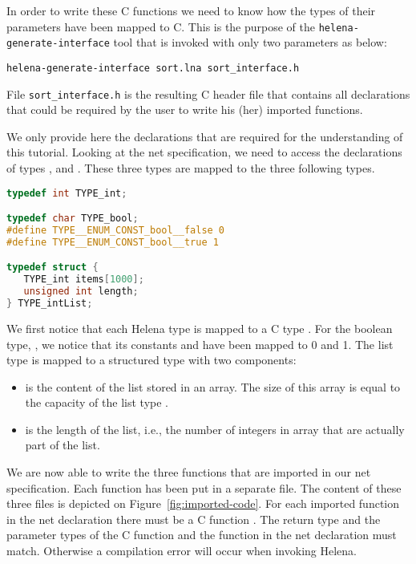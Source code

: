 In order to write these C functions we need to know how the types of
their parameters have been mapped to C.  This is the purpose of the
\verb+helena-generate-interface+ tool that is invoked with only two
parameters as below:
\begin{verbatim}
helena-generate-interface sort.lna sort_interface.h
\end{verbatim}
File \verb+sort_interface.h+ is the resulting C header file that
contains all declarations that could be required by the user to write
his (her) imported functions.

We only provide here the declarations that are required for the
understanding of this tutorial.  Looking at the net specification, we
need to access the declarations of types ,  and
.  These three types are mapped to the three following types.
\begin{lstlisting}[language=C]
typedef int TYPE_int;

typedef char TYPE_bool;
#define TYPE__ENUM_CONST_bool__false 0
#define TYPE__ENUM_CONST_bool__true 1

typedef struct {
   TYPE_int items[1000];
   unsigned int length;
} TYPE_intList;
\end{lstlisting}
We first notice that each Helena type  is mapped to a C
type .  For the boolean type, , we
notice that its constants  and  have been mapped to
0 and 1.  The list type  is mapped to a structured type
 with two components:
\begin{itemize}
\item{} is the content of the list stored in an array.  The
  size of this array is equal to the capacity of the list type
  .
\item{} is the length of the list, i.e., the number of
  integers in array  that are actually part of the list.
\end{itemize}

We are now able to write the three functions that are imported in our
net specification.  Each function has been put in a separate file.
The content of these three files is depicted on
Figure~\ref{fig:imported-code}.  For each imported function
 in the net declaration there must be a C function
.  The return type and the parameter
types of the C function and the function in the net declaration must
match.  Otherwise a compilation error will occur when invoking Helena.


